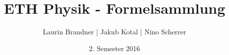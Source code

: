 \documentclass[a4paper, landscape]{article}
\begin{document}
\title{ETH Physik - Formelsammlung}
\date{2. Semester 2016}
\author{Laurin Brandner | Jakub Kotal | Nino Scherrer}
\maketitle










\end{document}
